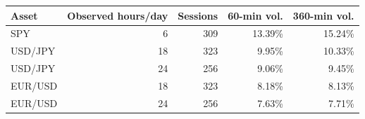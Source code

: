 \begin{tabular}{lrrrr}
\toprule
Asset & Observed hours/day & Sessions & 60-min vol. & 360-min vol. \\
\midrule
SPY & 6 & 309 & 13.39\% & 15.24\% \\
USD/JPY & 18 & 323 & 9.95\% & 10.33\% \\
USD/JPY & 24 & 256 & 9.06\% & 9.45\% \\
EUR/USD & 18 & 323 & 8.18\% & 8.13\% \\
EUR/USD & 24 & 256 & 7.63\% & 7.71\% \\
\bottomrule
\end{tabular}
